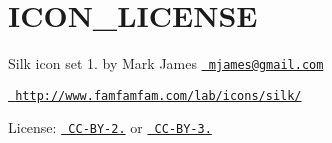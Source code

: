 \chapter{ICON\+\_\+\+LICENSE}
\hypertarget{md__c_1_2_users_2kmarty_2_documents_2_labo3__architecture__killian__marty_2_lib_2site-packages_235ec2b522e7b47431fc30f3075a016af}{}\label{md__c_1_2_users_2kmarty_2_documents_2_labo3__architecture__killian__marty_2_lib_2site-packages_235ec2b522e7b47431fc30f3075a016af}
Silk icon set 1. by Mark James \href{mailto:mjames@gmail.com}{\texttt{ mjames@gmail.\+com}}

\href{http://www.famfamfam.com/lab/icons/silk/}{\texttt{ http\+://www.\+famfamfam.\+com/lab/icons/silk/}}

License\+: \href{https://creativecommons.org/licenses/by/2.5/}{\texttt{ CC-\/\+BY-\/2.}} or \href{https://creativecommons.org/licenses/by/3.0/}{\texttt{ CC-\/\+BY-\/3.}} 